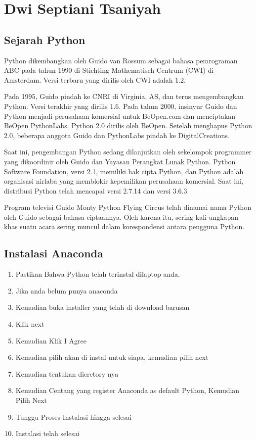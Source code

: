 \section{Dwi Septiani Tsaniyah}
\subsection{Sejarah Python}

Python dikembangkan oleh Guido van Rossum sebagai bahasa pemrograman ABC pada tahun 1990 di Stichting Mathematisch Centrum (CWI) di Amsterdam. Versi terbaru yang dirilis oleh CWI adalah 1.2.

Pada 1995, Guido pindah ke CNRI di Virginia, AS, dan terus mengembangkan Python. Versi terakhir yang dirilis 1.6. Pada tahun 2000, insinyur Guido dan Python menjadi perusahaan komersial untuk BeOpen.com dan menciptakan BeOpen PythonLabs. Python 2.0 dirilis oleh BeOpen. Setelah menghapus Python 2.0, beberapa anggota Guido dan PythonLabs pindah ke DigitalCreations.

Saat ini, pengembangan Python sedang dilanjutkan oleh sekelompok programmer yang dikoordinir oleh Guido dan Yayasan Perangkat Lunak Python. Python Software Foundation, versi 2.1, memiliki hak cipta Python, dan Python adalah organisasi nirlaba yang memblokir kepemilikan perusahaan komersial. Saat ini, distribusi Python telah mencapai versi 2.7.14 dan versi 3.6.3

Program televisi Guido Monty Python Flying Circus telah dinamai nama Python oleh Guido sebagai bahasa ciptaannya. Oleh karena itu, sering kali ungkapan khas suatu acara sering muncul dalam korespondensi antara pengguna Python.

\subsection{Instalasi Anaconda}
\begin{enumerate}
    \item Pastikan Bahwa Python telah terinstal dilaptop anda.
    \item Jika anda belum punya anaconda
    \item Kemudian buka installer yang telah di download barusan
    \item Klik next
    

    \item Kemudian Klik I Agree
    

    \item Kemudian pilih akan di instal untuk siapa, kemudian pilih next
    

    \item Kemudian tentukan dicretory nya
    

    \item Kemudian Centang yang register Anaconda as default Python, Kemudian Pilih Next
    

    \item Tunggu Proses Instalasi hingga selesai
    

    \item Instalasi telah selesai
	\end{enumerate}
    
